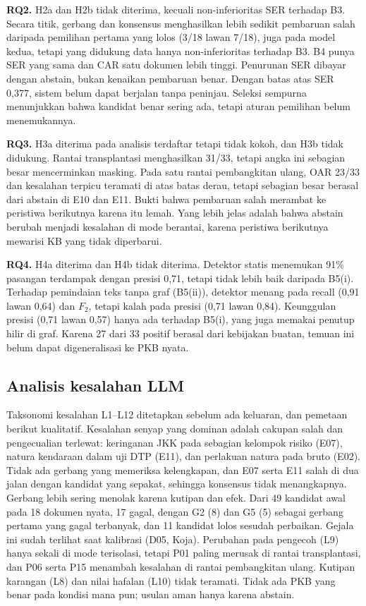 \documentclass[conference]{IEEEtran}
\makeatletter
\DeclareRobustCommand{\en}[1]{{\usefont{\f@encoding}{\f@family}{\f@series}{it}#1\/}}
\makeatother
\begin{document}
\textbf{RQ2.} H2a dan H2b tidak diterima, kecuali non-inferioritas SER terhadap B3. Secara titik, gerbang dan konsensus menghasilkan lebih sedikit pembaruan salah daripada pemilihan pertama yang lolos (3/18 lawan 7/18), juga pada model kedua, tetapi yang didukung data hanya non-inferioritas terhadap B3. B4 punya SER yang sama dan CAR satu dokumen lebih tinggi. Penurunan SER dibayar dengan \en{abstain}, bukan kenaikan pembaruan benar. Dengan batas atas SER 0,377, sistem belum dapat berjalan tanpa peninjau. Seleksi sempurna menunjukkan bahwa kandidat benar sering ada, tetapi aturan pemilihan belum menemukannya.

\textbf{RQ3.} H3a diterima pada analisis terdaftar tetapi tidak kokoh, dan H3b tidak didukung. Rantai transplantasi menghasilkan 31/33, tetapi angka ini sebagian besar mencerminkan \en{masking}. Pada satu rantai pembangkitan ulang, OAR 23/33 dan kesalahan terpicu teramati di atas batas derau, tetapi sebagian besar berasal dari \en{abstain} di E10 dan E11. Bukti bahwa pembaruan salah merambat ke peristiwa berikutnya karena itu lemah. Yang lebih jelas adalah bahwa \en{abstain} berubah menjadi kesalahan di mode berantai, karena peristiwa berikutnya mewarisi KB yang tidak diperbarui.

\textbf{RQ4.} H4a diterima dan H4b tidak diterima. Detektor statis menemukan 91\% pasangan terdampak dengan presisi 0,71, tetapi tidak lebih baik daripada B5(i). Terhadap pemindaian teks tanpa graf (B5(ii)), detektor menang pada \en{recall} (0,91 lawan 0,64) dan $F_2$, tetapi kalah pada presisi (0,71 lawan 0,84). Keunggulan presisi (0,71 lawan 0,57) hanya ada terhadap B5(i), yang juga memakai penutup hilir di graf. Karena 27 dari 33 positif berasal dari kebijakan buatan, temuan ini belum dapat digeneralisasi ke PKB nyata.

\subsection{Analisis kesalahan LLM}
Taksonomi kesalahan L1--L12 ditetapkan sebelum ada keluaran, dan pemetaan berikut kualitatif. Kesalahan senyap yang dominan adalah cakupan salah dan pengecualian terlewat: keringanan JKK pada sebagian kelompok risiko (E07), natura kendaraan dalam uji DTP (E11), dan perlakuan natura pada bruto (E02). Tidak ada gerbang yang memeriksa kelengkapan, dan E07 serta E11 salah di dua jalan dengan kandidat yang sepakat, sehingga konsensus tidak menangkapnya. Gerbang lebih sering menolak karena kutipan dan efek. Dari 49 kandidat awal pada 18 dokumen nyata, 17 gagal, dengan G2 (8) dan G5 (5) sebagai gerbang pertama yang gagal terbanyak, dan 11 kandidat lolos sesudah perbaikan. Gejala ini sudah terlihat saat kalibrasi (D05, Koja). Perubahan pada pengecoh (L9) hanya sekali di mode terisolasi, tetapi P01 paling merusak di rantai transplantasi, dan P06 serta P15 menambah kesalahan di rantai pembangkitan ulang. Kutipan karangan (L8) dan nilai hafalan (L10) tidak teramati. Tidak ada PKB yang benar pada kondisi mana pun; usulan aman hanya karena \en{abstain}.
\end{document}
